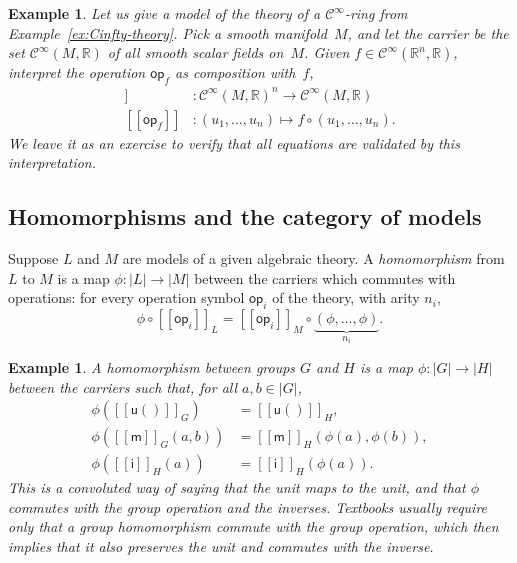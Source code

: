 \documentclass{amsart}
\newcommand{\RR}{\mathbb{R}}
\newcommand{\op}{\mathsf{op}}
\newcommand{\Cinfty}{\mathcal{C}^\infty}
\newcommand{\sem}[1]{[\![#1]\!]}
\newtheorem{example}[definition]{Example}
\begin{document}
\begin{example}
  Let us give a model of the theory of a $\Cinfty$-ring from
  Example~\ref{ex:Cinfty-theory}. Pick a smooth manifold~$M$, and let the carrier be the
  set $\Cinfty(M, \RR)$ of all smooth scalar fields on~$M$. Given
  $f \in \Cinfty(\RR^n, \RR)$, interpret the operation $\op_f$ as composition with~$f$,
  \begin{align*}
    \sem{\op_f} &: \Cinfty(M, \RR)^n \to \Cinfty(M, \RR) \\
    \sem{\op_f} &: (u_1, \ldots, u_n) \mapsto f \circ (u_1, \ldots, u_n).
  \end{align*}
  We leave it as an exercise to verify that all equations are validated by this
  interpretation.
\end{example}

\subsection{Homomorphisms and the category of models}
\label{sec:homom-categ-models}

Suppose $L$ and $M$ are models of a given algebraic theory. A \emph{homomorphism} from $L$
to $M$ is a map $\phi : |L| \to |M|$ between the carriers which commutes with operations:
for every operation symbol $\op_i$ of the theory, with arity $n_i$,
%
\begin{equation*}
  \phi \circ \sem{\op_i}_L = \sem{\op_i}_M \circ \underbrace{(\phi, \ldots, \phi)}_{n_i}.
\end{equation*}

\begin{example}
  A homomorphism between groups $G$ and $H$ is a map $\phi : |G| \to |H|$ between the
  carriers such that, for all $a, b \in |G|$,
  \begin{align*}
    \phi(\sem{\mathsf{u}()}_G) &= \sem{\mathsf{u}()}_H,\\
    \phi(\sem{\mathsf{m}}_G(a,b)) &= \sem{\mathsf{m}}_H(\phi(a), \phi(b)),\\
    \phi(\sem{\mathsf{i}}_H(a)) &= \sem{\mathsf{i}}_H(\phi(a)).
  \end{align*}
  This is a convoluted way of saying that the unit maps to the unit, and that $\phi$
  commutes with the group operation and the inverses. Textbooks usually require only that
  a group homomorphism commute with the group operation, which then implies that it also
  preserves the unit and commutes with the inverse.
\end{example}
\end{document}
